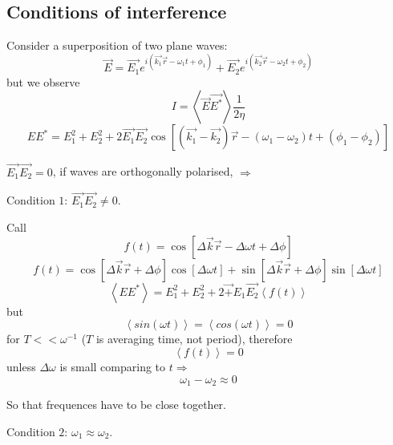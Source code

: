 \documentclass[10pt]{article}
\begin{document}
\subsection{Conditions of interference}
Consider a superposition of two plane waves:
\begin{equation*}
\vec{E} = \vec{E_1}e^{i(\vec{k_1}\vec{r} - \omega_1 t +\phi_1)} + \vec{E_2}e^{i(\vec{k_2}\vec{r} - \omega_2 t +\phi_2)}
\end{equation*}
but we observe
\begin{equation*}
I = \left\langle \vec{E}\vec{E^{*}}\right\rangle \frac{1}{2 \eta}
\end{equation*}
\begin{equation*}
EE^{*} = E_1 ^2 + E_2 ^2 + 2 \vec{E_1} \vec{E_2} \cos{[(\vec{k_1} - \vec{k_2})\vec{r} - (\omega_1 - \omega_2)t + (\phi_1 - \phi_2)]}
\end{equation*}

$\vec{E_1} \vec{E_2} = 0$, if waves are orthogonally polarised, $\Rightarrow$

Condition $1$: $\vec{E_1} \vec{E_2} \neq 0$.

Call
\begin{equation*}
f(t) = \cos{[\Delta \vec{k}\vec{r} - \Delta \omega t + \Delta \phi]}
\end{equation*}
\begin{equation*}
f(t) = \cos{[\Delta \vec{k}\vec{r} + \Delta \phi]} \cos{[\Delta \omega t]} + \sin{[\Delta \vec{k}\vec{r} + \Delta \phi]} \sin{[\Delta \omega t]}
\end{equation*}
\begin{equation*}
\left\langle EE^* \right\rangle = E_1 ^2 + E_2 ^2 + 2\vec+{E_1} \vec{E_2} \left\langle f(t) \right\rangle
\end{equation*}
but
\begin{equation*}
\left\langle sin{(\omega t)} \right\rangle = \left\langle cos{(\omega t)} \right\rangle = 0
\end{equation*}
for $T << \omega^{-1}$ ($T$ is averaging time, not period), therefore
\begin{equation*}
\left\langle f(t) \right\rangle = 0
\end{equation*}
unless $\Delta \omega$ is small comparing to $t \Rightarrow$
\begin{equation*}
\omega_1 - \omega_2 \approx 0
\end{equation*}

So that frequences have to be close together.

Condition $2$: $\omega_1 \approx \omega_2$.
\end{document}
